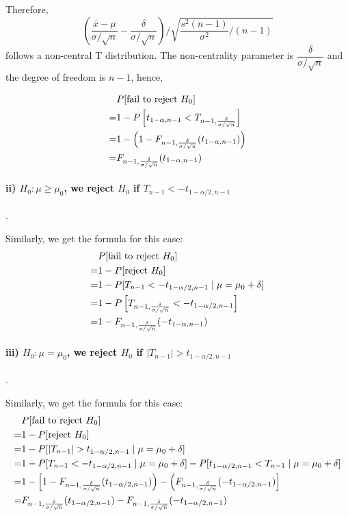 \documentclass[conf]{new-aiaa}
\begin{document}
Therefore, 
$$\left(\frac{\bar{x} - \mu}{\sigma/\sqrt{n}} - \frac{\delta}{\sigma / \sqrt{n}} \right) \Bigg/ \sqrt{\frac{s^2(n-1)}{\sigma^2}/(n-1)}$$ 
follows a non-central T distribution. The non-centrality parameter is  $\dfrac{\delta}{\sigma / \sqrt{n}}$ and the degree of freedom is $n-1$, hence,

\begin{align*}
&P[{\rm fail\ to\ reject\ }H_0]\\
=&1-P\left[t_{1-\alpha,n-1}<T_{n-1,  \frac{\delta}{\sigma / \sqrt{n}}}\right]\\
=&1-\left(1- F_{n-1,  \frac{\delta}{\sigma / \sqrt{n}}}(t_{1-\alpha, n-1})\right)\\
=&F_{n-1, \frac{\delta}{\sigma / \sqrt{n}}}(t_{1-\alpha, n-1})
\end{align*}

\paragraph{ii) $H_0:\mu\geqslant\mu_0$, we reject $H_0$ if $T_{n-1}<-t_{1-\alpha/2,n-1}$}\label{formula-3}.\ \medskip

Similarly, we get the formula for this case:
\begin{align*}
&P[{\rm fail\ to\ reject\ }H_0]\\
=&1-P[{\rm reject\ }H_0]\\
=&1-P[T_{n-1}<-t_{1-\alpha/2,n-1} \mid \mu=\mu_0+\delta]\\
=&1-P\left[T_{n-1,  \frac{\delta}{\sigma / \sqrt{n}}}<-t_{1-\alpha/2,n-1}\right]\\
=&1 - F_{n-1, \frac{\delta}{\sigma / \sqrt{n}}}(-t_{1-\alpha, n-1})
\end{align*}

\paragraph{iii) $H_0:\mu=\mu_0$, we reject $H_0$ if $|T_{n-1}|>t_{1-\alpha/2,n-1}$}.\ \medskip

Similarly, we get the formula for this case:
\begin{align*}
&P[{\rm fail\ to\ reject\ }H_0]\\
=&1-P[{\rm reject\ }H_0]\\
=&1-P[|T_{n-1}|>t_{1-\alpha/2,n-1} \mid \mu=\mu_0+\delta]\\
=&1-P[T_{n-1}<-t_{1-\alpha/2,n-1} \mid \mu=\mu_0+\delta] - P[t_{1-\alpha/2,n-1}< T_{n-1}  \mid\mu=\mu_0+\delta]\\
=&1 - \left[ 1 - F_{n-1, \frac{\delta}{\sigma / \sqrt{n}}}(t_{1-\alpha/2, n-1}) \right) - \left(F_{n-1, \frac{\delta}{\sigma / \sqrt{n}}}(-t_{1-\alpha/2, n-1})\right]\\
=& F_{n-1, \frac{\delta}{\sigma / \sqrt{n}}}(t_{1-\alpha/2, n-1}) - F_{n-1, \frac{\delta}{\sigma / \sqrt{n}}}(-t_{1-\alpha/2, n-1})
\end{align*}
\end{document}
